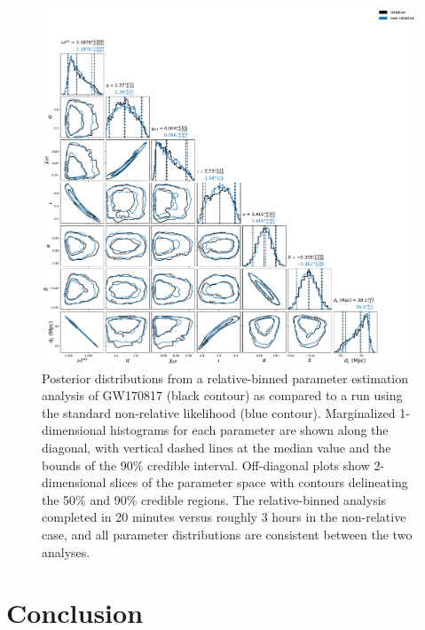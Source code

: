 \begin{figure}[ht]
\includegraphics[width=\textwidth]{Figures/rel-bin-pe/gw170817_comparison_to_nonrel_src_frame.pdf}
\caption{Posterior distributions from a relative-binned parameter estimation analysis of GW170817 (black contour) as compared to a run using the standard non-relative likelihood (blue contour). Marginalized 1-dimensional histograms for each parameter are shown along the diagonal, with vertical dashed lines at the median value and the bounds of the 90\% credible interval. Off-diagonal plots show 2-dimensional slices of the parameter space with contours delineating the 50\% and 90\% credible regions. The relative-binned analysis completed in 20 minutes versus roughly 3 hours in the non-relative case, and all parameter distributions are consistent between the two analyses.}
\label{fig:gw170817_comparison}
\end{figure}

\section{Conclusion}\label{sec:rel_bin_conclusion}

